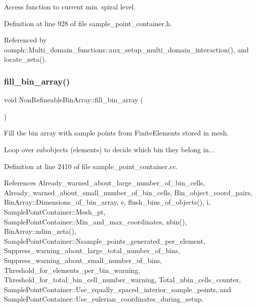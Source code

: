 Access function to current min. spiral level. 



Definition at line 928 of file sample\+\_\+point\+\_\+container.\+h.



Referenced by oomph\+::\+Multi\+\_\+domain\+\_\+functions\+::aux\+\_\+setup\+\_\+multi\+\_\+domain\+\_\+interaction(), and locate\+\_\+zeta().

\mbox{\label{classNonRefineableBinArray_a092b4de479924b7c13800cdae75ad5db}} 
\subsubsection{\texorpdfstring{fill\+\_\+bin\+\_\+array()}{fill\_bin\_array()}}
{\footnotesize\ttfamily void Non\+Refineable\+Bin\+Array\+::fill\+\_\+bin\+\_\+array (\begin{DoxyParamCaption}{ }\end{DoxyParamCaption})\hspace{0.3cm}{\ttfamily [private]}}



Fill the bin array with sample points from Finite\+Elements stored in mesh. 

Loop over subobjects (elements) to decide which bin they belong in... 

Definition at line 2410 of file sample\+\_\+point\+\_\+container.\+cc.



References Already\+\_\+warned\+\_\+about\+\_\+large\+\_\+number\+\_\+of\+\_\+bin\+\_\+cells, Already\+\_\+warned\+\_\+about\+\_\+small\+\_\+number\+\_\+of\+\_\+bin\+\_\+cells, Bin\+\_\+object\+\_\+coord\+\_\+pairs, Bin\+Array\+::\+Dimensions\+\_\+of\+\_\+bin\+\_\+array, e, flush\+\_\+bins\+\_\+of\+\_\+objects(), i, Sample\+Point\+Container\+::\+Mesh\+\_\+pt, Sample\+Point\+Container\+::\+Min\+\_\+and\+\_\+max\+\_\+coordinates, nbin(), Bin\+Array\+::ndim\+\_\+zeta(), Sample\+Point\+Container\+::\+Nsample\+\_\+points\+\_\+generated\+\_\+per\+\_\+element, Suppress\+\_\+warning\+\_\+about\+\_\+large\+\_\+total\+\_\+number\+\_\+of\+\_\+bins, Suppress\+\_\+warning\+\_\+about\+\_\+small\+\_\+number\+\_\+of\+\_\+bins, Threshold\+\_\+for\+\_\+elements\+\_\+per\+\_\+bin\+\_\+warning, Threshold\+\_\+for\+\_\+total\+\_\+bin\+\_\+cell\+\_\+number\+\_\+warning, Total\+\_\+nbin\+\_\+cells\+\_\+counter, Sample\+Point\+Container\+::\+Use\+\_\+equally\+\_\+spaced\+\_\+interior\+\_\+sample\+\_\+points, and Sample\+Point\+Container\+::\+Use\+\_\+eulerian\+\_\+coordinates\+\_\+during\+\_\+setup.



